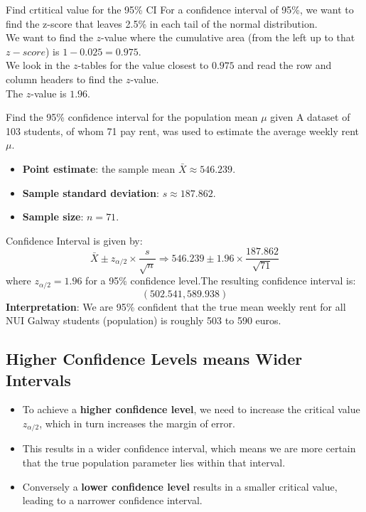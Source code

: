 \documentclass[10pt, total={6in, 8in}]{extarticle}
\begin{document}
\begin{examplebox}{Find crtitical value for the 95\% CI}{}
    For a confidence interval of 95\%, we want to find the z-score that leaves 2.5\% in each tail of the normal distribution.\\
    We want to find the $z$-value where the cumulative area (from the left up to that $z-score$) is $1 - 0.025 = 0.975$.\\
    We look in the $z$-tables for the value closest to $0.975$ and read the row and column headers to find the $z$-value.\\
    The $z$-value is $1.96$.\\
\end{examplebox}

\begin{examplebox}{Find the 95\% confidence interval for the population mean $\mu$ given}{}
    A dataset of 103 students, of whom 71 pay rent, was used to estimate the average weekly rent $\mu$.
    \begin{itemize}
        \item \textbf{Point estimate}: the sample mean $\bar{X} \approx 546.239$.
        \item \textbf{Sample standard deviation}: $s \approx 187.862$.
        \item \textbf{Sample size}: $n = 71$.
    \end{itemize}
    Confidence Interval is given by:
    $$\bar{X} \pm z_{\alpha/2} \times \frac{s}{\sqrt{n}}\Rightarrow 546.239 \pm 1.96 \times \frac{187.862}{\sqrt{71}}$$
    where $z_{\alpha/2} = 1.96$ for a 95\% confidence level.The resulting confidence interval is:
    $$(502.541, 589.938)$$
    \textbf{Interpretation}: We are 95\% confident that the true mean weekly rent for all NUI Galway students (population) is roughly 503 to 590 euros.
\end{examplebox}
\subsection{Higher Confidence Levels means Wider Intervals}
\begin{itemize}
    \item To achieve a \textbf{higher confidence level}, we need to increase the critical value $z_{\alpha/2}$, which in turn increases the margin of error.
    \item This results in a wider confidence interval, which means we are more certain that the true population parameter lies within that interval.
    \item Conversely a \textbf{lower confidence level} results in a smaller critical value, leading to a narrower confidence interval.
\end{itemize}
\end{document}
